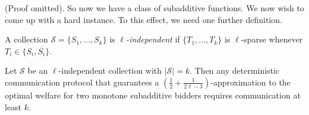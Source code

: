   (Proof omitted). So now we have a class of subadditive functions. We now wish to
  come up with a hard instance. To this effect, we need one further definition.

  \begin{definition} A collection $\mathcal{S} = \{S_1,\ldots,
  S_k\}$ is \emph{$\ell$-independent} if $\{T_1,\ldots, T_k\}$ is $\ell$-sparse
  whenever $T_i \in \{S_i, \overline{S_i}\}$.  \end{definition}

  \begin{proposition}\label{prop:lindependent}Let $\mathcal{S}$ be an
  $\ell$-independent collection with $|\mathcal{S}| = k$. Then any deterministic
  communication protocol that guarantees a $(\frac{1}{2} +
  \frac{1}{2\ell-3})$-approximation to the optimal welfare for two monotone
  subadditive bidders requires communication at least $k$.  \end{proposition}


